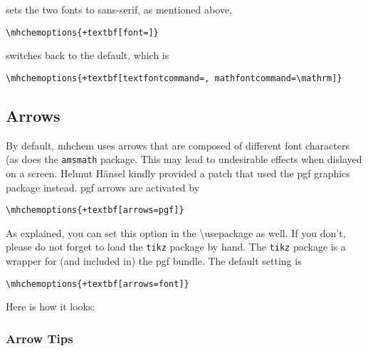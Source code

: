 \documentclass[a4paper,notitlepage]{scrreprt}
\newcommand\macro[1]{{\ttfamily\textbackslash#1}}
\begin{document}
\noindent
sets the two fonts to sans-serif, as mentioned above,  

\begin{Verbatim}[commandchars=+\[\]]
  \mhchemoptions{+textbf[font=]}
\end{Verbatim}

\noindent
switches back to the default, which is

\begin{Verbatim}[commandchars=+\[\]]
  \mhchemoptions{+textbf[textfontcommand=, mathfontcommand=\mathrm]}
\end{Verbatim}


\subsection{Arrows}

By default, mhchem uses arrows that are composed of different font characters (as does the \verb|amsmath| package. This may lead to undesirable effects when dislayed on a screen. Helmut Hänsel kindly provided a patch that used the pgf graphics package instead. pgf arrows are activated by

\begin{Verbatim}[commandchars=+\[\]]
  \mhchemoptions{+textbf[arrows=pgf]}
\end{Verbatim}

\noindent
As explained, you can set this option in the \macro{usepackage} as well. If you don't, please do not forget to load the \verb|tikz| package by hand. The \verb|tikz| package is a wrapper for (and included in) the pgf bundle. The default setting is 

\begin{Verbatim}[commandchars=+\[\]]
  \mhchemoptions{+textbf[arrows=font]}
\end{Verbatim}

\noindent
Here is how it looks:

\medskip
\begin{SideBySideExample}[xrightmargin=5cm]
\end{SideBySideExample}

\medskip
\begin{SideBySideExample}[xrightmargin=5cm]
\end{SideBySideExample}
 

\subsubsection{Arrow Tips}
\end{document}
